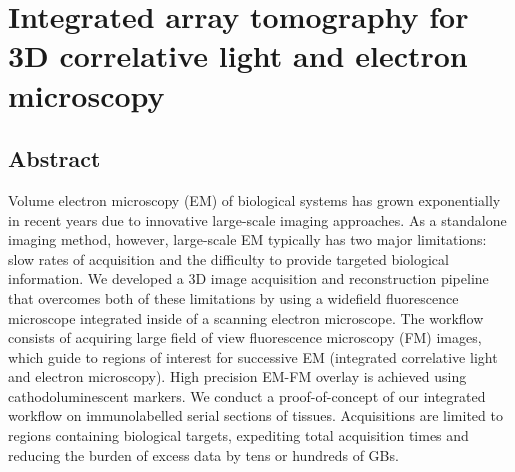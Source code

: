 \chapter{Integrated array tomography for 3D correlative light and electron microscopy}
\label{chap:3}
\begin{refsection}

\section*{Abstract}
\begin{small}
    Volume electron microscopy (EM) of biological systems has grown exponentially in recent years due to innovative large-scale imaging approaches. As a standalone imaging method, however, large-scale EM typically has two major limitations: slow rates of acquisition and the difficulty to provide targeted biological information. We developed a 3D image acquisition and reconstruction pipeline that overcomes both of these limitations by using a widefield fluorescence microscope integrated inside of a scanning electron microscope. The workflow consists of acquiring large field of view fluorescence microscopy (FM) images, which guide to regions of interest for successive EM (integrated correlative light and electron microscopy). High precision EM-FM overlay is achieved using cathodoluminescent markers. We conduct a proof-of-concept of our integrated workflow on immunolabelled serial sections of tissues. Acquisitions are limited to regions containing biological targets, expediting total acquisition times and reducing the burden of excess data by tens or hundreds of GBs.
\end{small}

% 
% 
% 
% 

\printbibliography[title={References}]
\end{refsection}
